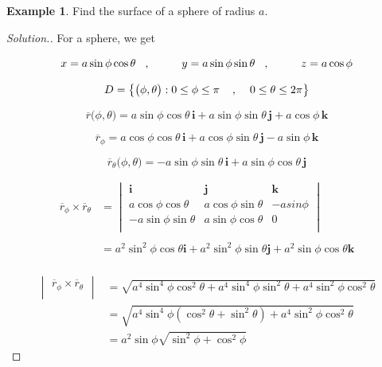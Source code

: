 \documentclass[11pt,a4paper]{article}
\theoremstyle{definition}
\newtheorem{exa}[thm]{Example}
\newenvironment{solution}
  {\renewcommand{\qedsymbol}{}\begin{proof}[\textit{Solution}.]}
  {\end{proof}}
\begin{document}
\begin{exa}


Find the surface of a sphere of radius $a$.
\end{exa}


\begin{solution}


For a sphere, we get 

$$ x = a\sin \phi \cos \theta\hspace{0.3cm}, \hspace{1cm} y = a\sin \phi \sin \theta \hspace{0.3cm}, \hspace{1cm} z = a\cos \phi$$

$$D = \big\{\big(\phi, \theta\big) : 0\leq \phi \leq \pi\hspace{0.4cm} , \hspace{0.4cm} 0 \leq \theta \leq 2\pi\big\}$$

$$\overline{r}\big(\phi, \theta\big) = a \sin \phi \cos \theta\, \textbf{i} + a \sin \phi \sin \theta\, \textbf{j} + a\cos \phi \,\textbf{k}$$

$$\overline{r}_{\phi}  = a \cos \phi \cos \theta\, \textbf{i} + a \cos \phi \sin \theta\, \textbf{j} - a\sin \phi \,\textbf{k}$$

$$\overline{r}_{\theta} \big(\phi,\theta\big) = -a\sin\phi \sin \theta \,\textbf{i} + a\sin \phi \cos \theta \,\textbf{j}$$

\begin{align*}
\overline{r}_{\phi} \times \overline{r}_{\theta} & = \begin{vmatrix}
\textbf{i} & \textbf{j} & \textbf{k}\\
a\cos \phi \cos \theta & a\cos \phi \sin \theta & -asin\phi\\
-a\sin \phi \sin \theta & a\sin \phi \cos \theta & 0\\
\end{vmatrix}\\\\
& = a^2 \sin^2\phi \cos \theta \textbf{i} + a^2\sin^2 \phi \sin \theta \textbf{j} + a^2\sin \phi \cos \theta \textbf{k}\\
\end{align*}

\begin{align*}
\begin{vmatrix}
\overline{r}_{\phi} \times \overline{r}_{\theta}\\
\end{vmatrix} & = \sqrt{a^4\sin^4\phi \cos^2\theta + a^4\sin^4\phi \sin^2\theta + a^4\sin^2\phi \cos^2\theta}\\
 & = \sqrt{a^4\sin^4\phi ( \cos^2\theta + \sin^2 \theta) + a^4 \sin^2 \phi \cos^2\theta}\\
& = a^2 \sin \phi \sqrt{\sin^2 \phi + \cos^2\phi}
\end{align*}


\end{solution}
\end{document}
